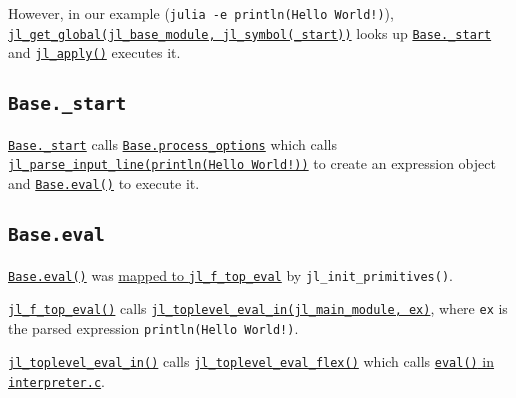 However, in our example (\texttt{julia -e {\textquotesingle}println({\textquotedbl}Hello World!{\textquotedbl}){\textquotesingle}}), \href{https://github.com/JuliaLang/julia/blob/master/src/module.c}{\texttt{jl\_get\_global(jl\_base\_module, jl\_symbol({\textquotedbl}\_start{\textquotedbl}))}} looks up \href{https://github.com/JuliaLang/julia/blob/master/base/client.jl}{\texttt{Base.\_start}} and \href{https://github.com/JuliaLang/julia/blob/master/src/julia.h}{\texttt{jl\_apply()}} executes it.



\hypertarget{12561163861893339364}{}


\subsection{\texttt{Base.\_start}}



\href{https://github.com/JuliaLang/julia/blob/master/base/client.jl}{\texttt{Base.\_start}} calls \href{https://github.com/JuliaLang/julia/blob/master/base/client.jl}{\texttt{Base.process\_options}} which calls \href{https://github.com/JuliaLang/julia/blob/master/src/ast.c}{\texttt{jl\_parse\_input\_line({\textquotedbl}println({\textquotedbl}Hello World!{\textquotedbl}){\textquotedbl})}} to create an expression object and \hyperlink{7507639810592563424}{\texttt{Base.eval()}} to execute it.



\hypertarget{5161519074100035363}{}


\subsection{\texttt{Base.eval}}



\hyperlink{7507639810592563424}{\texttt{Base.eval()}} was \href{https://github.com/JuliaLang/julia/blob/master/src/builtins.c}{mapped to \texttt{jl\_f\_top\_eval}} by \texttt{jl\_init\_primitives()}.



\href{https://github.com/JuliaLang/julia/blob/master/src/builtins.c}{\texttt{jl\_f\_top\_eval()}} calls \href{https://github.com/JuliaLang/julia/blob/master/src/builtins.c}{\texttt{jl\_toplevel\_eval\_in(jl\_main\_module, ex)}}, where \texttt{ex} is the parsed expression \texttt{println({\textquotedbl}Hello World!{\textquotedbl})}.



\href{https://github.com/JuliaLang/julia/blob/master/src/builtins.c}{\texttt{jl\_toplevel\_eval\_in()}} calls \href{https://github.com/JuliaLang/julia/blob/master/src/toplevel.c}{\texttt{jl\_toplevel\_eval\_flex()}} which calls \href{https://github.com/JuliaLang/julia/blob/master/src/interpreter.c}{\texttt{eval()} in \texttt{interpreter.c}}.



